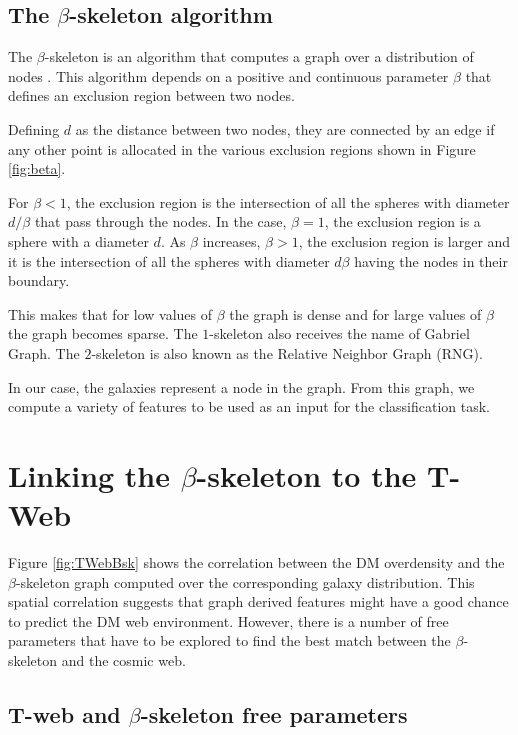 \documentclass[usenatbib]{mnras}
\begin{document}
\subsection{The $\beta$-skeleton algorithm}

The $\beta$-skeleton is an algorithm that computes a graph over a
distribution of nodes \citep{Kirkpatrick1985, Fang2019}.  
This algorithm depends on a positive and continuous parameter $\beta$
that defines an exclusion region between two nodes.

Defining $d$ as the distance between two nodes, they are connected by
an edge if any other point is allocated in the various exclusion
regions shown in Figure \ref{fig:beta}.  

For $\beta<1$, the exclusion region is the intersection of all the
spheres with diameter $d/\beta$ that pass through the nodes. In the
case, $\beta=1$, the exclusion region is a sphere with a diameter $d$.   
As $\beta$ increases, $\beta>1$, the exclusion region is larger and it
is the intersection of all the spheres with diameter $d\beta$ having
the nodes in their boundary.  

This makes that for low values of $\beta$ the graph is dense and for
large values of $\beta$ the graph becomes sparse. 
The $1$-skeleton also receives the name of Gabriel Graph.  
The $2$-skeleton is also known as the Relative Neighbor Graph (RNG).

In our case, the galaxies represent a node in the graph.
From this graph, we compute a variety of features to be used as an
input for the classification task.  



\section{Linking the $\beta$-skeleton to the T-Web}\label{sec:link}

Figure \ref{fig:TWebBsk} shows the correlation between the DM overdensity
and the $\beta$-skeleton graph computed over the corresponding galaxy
distribution. 
This spatial correlation suggests that graph derived features might have
a good chance to predict the DM web environment. 
However, there is a number of free parameters that have to be explored
to find the best match between the $\beta$-skeleton and the cosmic web.

\subsection{T-web and $\beta$-skeleton free parameters}
\end{document}
